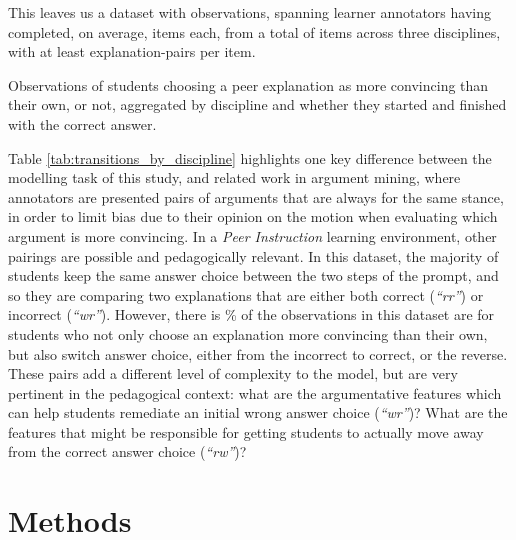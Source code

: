 \documentclass[runningheads]{llncs}
\begin{document}
This leaves us a dataset with observations, 
spanning  learner annotators having 
completed, on average, 
 items each, from a total of 
 items across three disciplines, 
with at least 
explanation-pairs 
per item.


\begin{table}
	\caption{Observations of students choosing a peer explanation as 
		more 
		convincing than their own, or not, aggregated by discipline and whether 
		they 
		started and finished with the correct answer.}
	
	\centerline{}
	
	\label{tab:transitions_by_discipline}
\end{table}

Table \ref{tab:transitions_by_discipline} highlights one key difference between 
the modelling task of this study, and related work in argument mining, where 
annotators are presented pairs of arguments that are always for the same 
stance, in order to limit bias due to their opinion on the motion when 
evaluating which argument is more convincing.
In a \textit{Peer Instruction} learning environment, other pairings are 
possible and pedagogically relevant. 
In this dataset, the majority of students keep the same answer choice between 
the two steps of the prompt, and so they are comparing two explanations that 
are either both correct (\textit{``rr''}) or incorrect (\textit{``wr''}). 
However, there is \% of the 
observations in this dataset are for students who not only choose an 
explanation more convincing than their own, but also switch answer choice, 
either from the incorrect to correct, or the reverse. 
These pairs add a different level of complexity to the model, but are very 
pertinent in the pedagogical context: what are the argumentative features which 
can help students remediate an initial wrong answer choice (\textit{``wr''})?
What are the features that might be responsible for getting students to 
actually move away from the correct answer choice (\textit{``rw''})?



\section{Methods}
\end{document}
